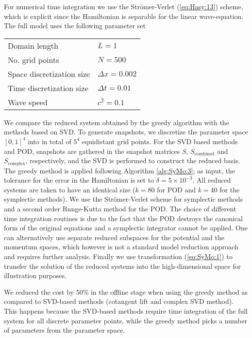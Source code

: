 \documentclass[final]{siamart}
\begin{document}
For numerical time integration we {{\color{black}} use} the Str\"omer-Verlet (\ref{eq:Hasy:13}) scheme, {{\color{black}} which is explicit since} the Hamiltonian is separable for the linear wave-equation. The full model uses the following parameter set \vspace{0.5cm}
\begin{center}
\begin{tabular}{|l|l|}
\hline
Domain length & $L = 1$ \\
No. grid points & $N = 500$ \\
Space discretization size & $\Delta x = 0.002$ \\
Time discretization size & $\Delta t = 0.01$ \\
Wave speed & $c^2 = 0.1$ \\
\hline
\end{tabular}
\end{center}
\vspace{0.5cm}
We compare the reduced system obtained by the greedy algorithm with the methods based on SVD. To generate snapshots, we discretize the parameter space $[0,1]^4$ into in total of $5^4$ equidistant grid points. For the SVD based methods and POD, snapshots are gathered in the snapshot matrices $S$, $S_{\text{combined}}$ and $S_{\text{complex}}$, respectively, and the SVD is performed to construct the reduced basis. The greedy method is applied following Algorithm \ref{alg:SyMo:3}; as input, the tolerance for the error in the Hamiltonian is set to $\delta = 5 \times 10^{-3}$. All reduced systems are taken to have an identical size ($k=80$ for POD and $k=40$ for the symplectic methods). We use the {{\color{black}} Str\"omer-Verlet} scheme for symplectic methods and a second order Runge-Kutta method for the POD. {{\color{black}} The choice of different time integration routines is due to the fact that the POD destroys the canonical form of the original equations and a symplectic integrator cannot be applied. One can alternatively use separate reduced subspaces for the potential and the momentum spaces, which however is not a standard model reduction approach and requires further analysis.} Finally we use transformation (\ref{eq:SyMo:1}) to transfer the solution of the reduced systems into the high-dimensional space for illustration purposes.

We reduced the cost by 50\% in the offline stage when using the greedy method as compared to SVD-based methods (cotangent lift and complex SVD method). This happens because the SVD-based methods require time integration of the full system for all discrete parameter points, while the greedy method picks a number of parameters from the parameter space. 
\end{document}
